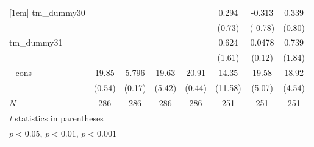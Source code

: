 {\begin{tabular}{l*{7}{c}}
[1em]
tm\_dummy30  &                     &                     &                     &                     &       0.294         &      -0.313         &       0.339         \\
            &                     &                     &                     &                     &      (0.73)         &     (-0.78)         &      (0.80)         \\
[1em]
tm\_dummy31  &                     &                     &                     &                     &       0.624         &      0.0478         &       0.739         \\
            &                     &                     &                     &                     &      (1.61)         &      (0.12)         &      (1.84)         \\
[1em]
\_cons      &       19.85         &       5.796         &       19.63\sym{***}&       20.91         &       14.35\sym{***}&       19.58\sym{***}&       18.92\sym{***}\\
            &      (0.54)         &      (0.17)         &      (5.42)         &      (0.44)         &     (11.58)         &      (5.07)         &      (4.54)         \\
\hline
\(N\)       &         286         &         286         &         286         &         286         &         251         &         251         &         251         \\
\hline\hline
\multicolumn{8}{l}{\footnotesize \textit{t} statistics in parentheses}\\
\multicolumn{8}{l}{\footnotesize \sym{*} \(p<0.05\), \sym{**} \(p<0.01\), \sym{***} \(p<0.001\)}\\
\end{tabular}
}
